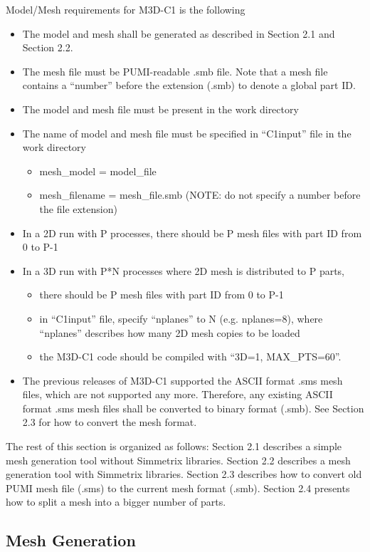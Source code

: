 Model/Mesh requirements for M3D-C1 is the following
\begin{itemize}
\item	The model and mesh shall be generated as described in Section 2.1 and Section 2.2.
\item	The mesh file must be PUMI-readable .smb file. Note that a mesh file contains a “number” before the extension (.smb) to denote a global part ID.
\item	The model and mesh file must be present in the work directory
\item	The name of model and mesh file must be specified in “C1input” file in the work directory
\begin{itemize}
\item	mesh\_model = model\_file
\item	mesh\_filename = mesh\_file.smb (NOTE: do not specify a number before the file extension)
\end{itemize}
\item In a 2D run with P processes, there should be P mesh files with part ID from 0 to P-1
\item	In a 3D run with P*N processes where 2D mesh is distributed to P parts, 
\begin{itemize}
\item	there should be P mesh files with part ID from 0 to P-1
\item	in “C1input” file, specify “nplanes” to N (e.g. nplanes=8), where “nplanes” describes how many 2D mesh copies to be loaded
\item	the M3D-C1 code should be compiled with “3D=1, MAX\_PTS=60”.
\end{itemize}
\item The previous releases of M3D-C1 supported the ASCII format .sms mesh files, which are not supported any more. Therefore, any existing ASCII format .sms mesh files shall be converted to binary format (.smb). See Section 2.3 for how to convert the mesh format.
\end{itemize}

The rest of this section is organized as follows: Section 2.1 describes a simple mesh generation tool without Simmetrix libraries. Section 2.2 describes a mesh generation tool with Simmetrix libraries. Section 2.3 describes how to convert old PUMI mesh file (.sms) to the current mesh format (.smb). Section 2.4 presents how to split a mesh into a bigger number of parts. 


\subsection{Mesh Generation}
